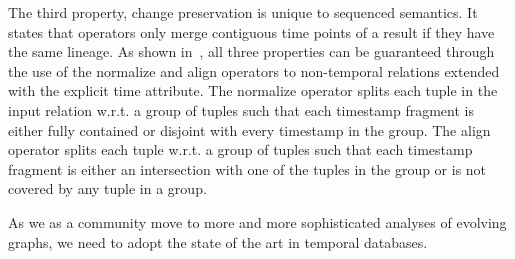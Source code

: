 The third property, change preservation is unique to sequenced
semantics.  It states that operators only merge contiguous time points
of a result if they have the same lineage.  As shown
in~\cite{Dignos2012}, all three properties can be guaranteed through
the use of the normalize and align operators to non-temporal relations
extended with the explicit time attribute.  The normalize operator
splits each tuple in the input relation w.r.t. a group of tuples such
that each timestamp fragment is either fully contained or disjoint
with every timestamp in the group.  The align operator splits each
tuple w.r.t. a group of tuples such that each timestamp fragment is
either an intersection with one of the tuples in the group or is not
covered by any tuple in a group.

As we as a community move to more and more sophisticated analyses of
evolving graphs, we need to adopt the state of the art in temporal
databases.
